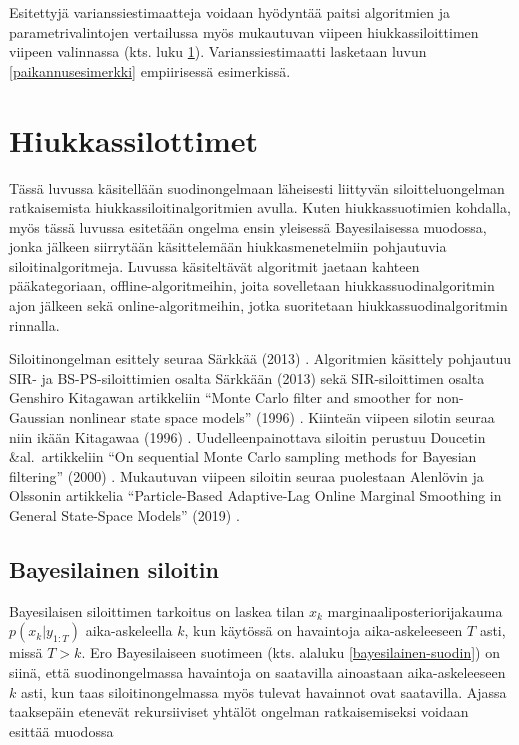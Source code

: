 \documentclass[
  12pt,
  a4paper, twoside]{book}
\begin{document}
Esitettyjä varianssiestimaatteja voidaan hyödyntää paitsi algoritmien ja parametrivalintojen vertailussa myös mukautuvan viipeen hiukkassiloittimen viipeen valinnassa (kts. luku \ref{hiukkassiloittimet}). Varianssiestimaatti lasketaan luvun \ref{paikannusesimerkki} empiirisessä esimerkissä.

\chapter{Hiukkassilottimet} \label{hiukkassiloittimet}

Tässä luvussa käsitellään suodinongelmaan läheisesti liittyvän siloitteluongelman ratkaisemista hiukkassiloitinalgoritmien avulla. Kuten hiukkassuotimien kohdalla, myös tässä luvussa esitetään ongelma ensin yleisessä Bayesilaisessa muodossa, jonka jälkeen siirrytään käsittelemään hiukkasmenetelmiin pohjautuvia siloitinalgoritmeja. Luvussa käsiteltävät algoritmit jaetaan kahteen pääkategoriaan, offline-algoritmeihin, joita sovelletaan hiukkassuodinalgoritmin ajon jälkeen sekä online-algoritmeihin, jotka suoritetaan hiukkassuodinalgoritmin rinnalla.

Siloitinongelman esittely seuraa Särkkää (2013) \citep{sarkka-2013}. Algoritmien käsittely pohjautuu SIR- ja BS-PS-siloittimien osalta Särkkään (2013) \citep{sarkka-2013} sekä SIR-siloittimen osalta Genshiro Kitagawan artikkeliin ``Monte Carlo filter and smoother for non-Gaussian nonlinear state space models'' (1996) \citep{kitagawa-1996}. Kiinteän viipeen silotin seuraa niin ikään Kitagawaa (1996) \citep{kitagawa-1996}. Uudelleenpainottava siloitin perustuu Doucetin \&al.~artikkeliin ``On sequential Monte Carlo sampling methods for Bayesian filtering'' (2000) \citep{Doucet-2000}. Mukautuvan viipeen siloitin seuraa puolestaan Alenlövin ja Olssonin artikkelia ``Particle-Based Adaptive-Lag Online Marginal Smoothing in General State-Space Models'' (2019) \citep{alenlov-2019}.

\section{Bayesilainen siloitin}

Bayesilaisen siloittimen tarkoitus on laskea tilan \(x_k\) marginaaliposteriorijakauma \(p(x_k|y_{1:T})\) aika-askeleella \(k\), kun käytössä on havaintoja aika-askeleeseen \(T\) asti, missä \(T>k\). Ero Bayesilaiseen suotimeen (kts. alaluku \ref{bayesilainen-suodin}) on siinä, että suodinongelmassa havaintoja on saatavilla ainoastaan aika-askeleeseen \(k\) asti, kun taas siloitinongelmassa myös tulevat havainnot ovat saatavilla. Ajassa taaksepäin etenevät rekursiiviset yhtälöt ongelman ratkaisemiseksi voidaan esittää muodossa
\end{document}
